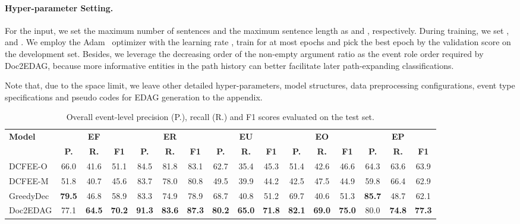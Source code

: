 \documentclass[11pt,a4paper]{article}
\begin{document}
\paragraph{Hyper-parameter Setting.}
For the input, we set the maximum number of sentences and the maximum sentence length as  and , respectively.
During training, we set ,  and .
We employ the Adam~\cite{kingma2014adam} optimizer with the learning rate ,
train for at most  epochs and pick the best epoch by the validation score on the development set.
Besides, we leverage the decreasing order of the non-empty argument ratio as the event role order required by Doc2EDAG, because more informative entities in the path history can better facilitate later path-expanding classifications.

Note that, due to the space limit, we leave other detailed hyper-parameters, model structures, data preprocessing configurations, event type specifications and pseudo codes for EDAG generation to the appendix.


\begin{table*}[tb]\small
\centering
\addtolength{\tabcolsep}{-1pt}
\begin{tabular}{l | ccc | ccc | ccc | ccc | ccc }
\toprule
\multirow{2}{*}{\textbf{Model}}
& \multicolumn{3}{c|}{\textbf{EF}}
& \multicolumn{3}{c|}{\textbf{ER}}
& \multicolumn{3}{c|}{\textbf{EU}}
& \multicolumn{3}{c|}{\textbf{EO}}
& \multicolumn{3}{c}{\textbf{EP}}
\\
& \textbf{P.} & \textbf{R.} & \textbf{F1}
& \textbf{P.} & \textbf{R.} & \textbf{F1}
& \textbf{P.} & \textbf{R.} & \textbf{F1}
& \textbf{P.} & \textbf{R.} & \textbf{F1}
& \textbf{P.} & \textbf{R.} & \textbf{F1}
\\
\midrule
DCFEE-O  & 66.0 & 41.6 & 51.1      & 84.5 & 81.8 & 83.1      & 62.7 & 35.4 & 45.3      & 51.4 & 42.6 & 46.6      & 64.3 & 63.6 & 63.9      
\\
DCFEE-M & 51.8 & 40.7 & 45.6 	 & 83.7 & 78.0 & 80.8 	 & 49.5 & 39.9 & 44.2 	 & 42.5 & 47.5 & 44.9 	 & 59.8 & 66.4 & 62.9 
\\
\midrule
GreedyDec  
& \textbf{79.5} & 46.8 & 58.9      & 83.3 & 74.9 & 78.9      & 68.7 & 40.8 & 51.2      & 69.7 & 40.6 & 51.3      & \textbf{85.7} & 48.7 & 62.1
\\
Doc2EDAG  
& 77.1 & \textbf{64.5} & \textbf{70.2}      & \textbf{91.3} & \textbf{83.6} & \textbf{87.3}      & \textbf{80.2} & \textbf{65.0} & \textbf{71.8}      & \textbf{82.1} & \textbf{69.0} & \textbf{75.0}      & 80.0 & \textbf{74.8} & \textbf{77.3}
\\
\bottomrule
\end{tabular}
\caption{Overall event-level precision (P.), recall (R.) and F1 scores evaluated on the test set.}
\label{tab:main_result}
\end{table*}
\end{document}
